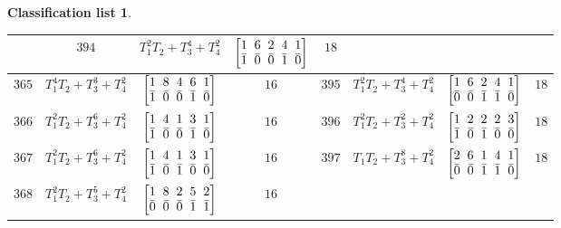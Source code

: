 \documentclass[10pt,a4paper]{amsart}
\theoremstyle{definition}
\newtheorem{class-list}[thm]{Classification list}
\numberwithin{equation}{section}
\begin{document}
\begin{class-list}
\begin{table}[h!]
\begin{tabu}{c|c|c|c||c|c|c|c}
&${394}$&${T_{1}^{2}T_{2}+T_{3}^{4}+T_{4}^{2}}$
&$\arraycolsep=1mm\begin{bmatrix}{1} & {6} & {2} & {4} & {1} \\ {\bar{1}} & {\bar{0}} & {\bar{0}} & {\bar{1}} & {\bar{0}}\end{bmatrix}$&${18}$
\\
\hline
${365}$&${T_{1}^{4}T_{2}+T_{3}^{3}+T_{4}^{2}}$
&$\arraycolsep=1mm\begin{bmatrix}{1} & {8} & {4} & {6} & {1} \\ {\bar{1}} & {\bar{0}} & {\bar{0}} & {\bar{1}} & {\bar{0}}\end{bmatrix}$&${16}$
&${395}$&${T_{1}^{2}T_{2}+T_{3}^{4}+T_{4}^{2}}$
&$\arraycolsep=1mm\begin{bmatrix}{1} & {6} & {2} & {4} & {1} \\ {\bar{0}} & {\bar{0}} & {\bar{1}} & {\bar{1}} & {\bar{0}}\end{bmatrix}$&${18}$
\\
\hline
${366}$&${T_{1}^{2}T_{2}+T_{3}^{6}+T_{4}^{2}}$
&$\arraycolsep=1mm\begin{bmatrix}{1} & {4} & {1} & {3} & {1} \\ {\bar{1}} & {\bar{0}} & {\bar{0}} & {\bar{1}} & {\bar{0}}\end{bmatrix}$&${16}$
&${396}$&${T_{1}^{2}T_{2}+T_{3}^{2}+T_{4}^{2}}$
&$\arraycolsep=1mm\begin{bmatrix}{1} & {2} & {2} & {2} & {3} \\ {\bar{1}} & {\bar{0}} & {\bar{1}} & {\bar{0}} & {\bar{0}}\end{bmatrix}$&${18}$
\\
\hline
${367}$&${T_{1}^{2}T_{2}+T_{3}^{6}+T_{4}^{2}}$
&$\arraycolsep=1mm\begin{bmatrix}{1} & {4} & {1} & {3} & {1} \\ {\bar{1}} & {\bar{0}} & {\bar{1}} & {\bar{0}} & {\bar{0}}\end{bmatrix}$&${16}$
&${397}$&${T_{1}T_{2}+T_{3}^{8}+T_{4}^{2}}$
&$\arraycolsep=1mm\begin{bmatrix}{2} & {6} & {1} & {4} & {1} \\ {\bar{0}} & {\bar{0}} & {\bar{1}} & {\bar{1}} & {\bar{0}}\end{bmatrix}$&${18}$
\\
\hline
${368}$&${T_{1}^{2}T_{2}+T_{3}^{5}+T_{4}^{2}}$
&$\arraycolsep=1mm\begin{bmatrix}{1} & {8} & {2} & {5} & {2} \\ {\bar{0}} & {\bar{0}} & {\bar{0}} & {\bar{1}} & {\bar{1}}\end{bmatrix}$&${16}$

\end{tabu}
\end{table}
\end{class-list}
\end{document}
